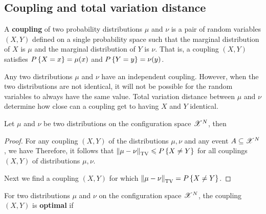\documentclass[letterpaper,english,10pt]{article}
\begin{document}
\subsection{Coupling and total variation distance}
\begin{defn}
A \textbf{coupling} of two probability distributions $\mu$ and $\nu$ is a pair of random variables $(X, Y)$ 
defined on a single probability space such that the marginal distribution of $X$ is $\mu$ and the marginal distribution of $Y$ is $\nu$. 
That is, a coupling $(X, Y)$ satisfies $P\left\{X = x\right\} = \mu(x)$ and $P\left\{Y = y\right\} = \nu(y)$. 
\end{defn}

Any two distributions $\mu$ and $\nu$ have an independent coupling. 
However, when the two distributions are not identical, 
it will not be possible for the random variables to always have the same value. 
Total variation distance between $\mu$ and $\nu$ determine how close can a coupling get to having $X$ and $Y$ identical. 
\begin{prop}
Let $\mu$ and $\nu$ be two distributions on the configuration space $\mathscr{X}^N$, then 
\end{prop}
\begin{proof}
For any coupling $(X,Y)$ of the distributions $\mu, \nu$ and any event $A \subseteq \mathscr{X}^N$, we have 
Therefore, it follows that $\left\lVert\mu-\nu\right\rVert_{\text{TV}}  \leqslant P\left\{X\neq Y\right\}$ for all  couplings $(X,Y)$ of distributions $\mu, \nu$. 

Next we find a coupling $(X,Y)$ for which $ \left\lVert\mu-\nu\right\rVert_{\text{TV}} = P\left\{X \neq Y\right\}$. 
\end{proof}
\begin{defn}
For two distributions $\mu$ and $\nu$ on the configuration space $\mathscr{X}^N$, 
the coupling $(X,Y)$ is \textbf{optimal} if  
\end{defn}
\end{document}

